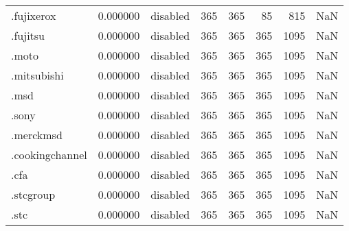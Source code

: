 \begin{tabular}{lrlrrrrl}
.fujixerox                &          0.000000 &        disabled &                         365 &                         365 &                          85 &                 815 &                  NaN \\
.fujitsu                  &          0.000000 &        disabled &                         365 &                         365 &                         365 &                1095 &                  NaN \\
.moto                     &          0.000000 &        disabled &                         365 &                         365 &                         365 &                1095 &                  NaN \\
.mitsubishi               &          0.000000 &        disabled &                         365 &                         365 &                         365 &                1095 &                  NaN \\
.msd                      &          0.000000 &        disabled &                         365 &                         365 &                         365 &                1095 &                  NaN \\
.sony                     &          0.000000 &        disabled &                         365 &                         365 &                         365 &                1095 &                  NaN \\
.merckmsd                 &          0.000000 &        disabled &                         365 &                         365 &                         365 &                1095 &                  NaN \\
.cookingchannel           &          0.000000 &        disabled &                         365 &                         365 &                         365 &                1095 &                  NaN \\
.cfa                      &          0.000000 &        disabled &                         365 &                         365 &                         365 &                1095 &                  NaN \\
.stcgroup                 &          0.000000 &        disabled &                         365 &                         365 &                         365 &                1095 &                  NaN \\
.stc                      &          0.000000 &        disabled &                         365 &                         365 &                         365 &                1095 &                  NaN \\

\end{tabular}
